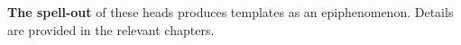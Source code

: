 \textbf{The spell-out} of these heads produces templates as an epiphenomenon. Details are provided in the relevant chapters.

%
%
%

